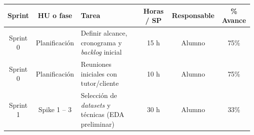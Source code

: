 \documentclass[
11pt, %
]{charter}
\begin{document}


\begin{table}[htpb]
\centering
\begin{tabularx}{\linewidth}{@{}|c|c|X|c|c|c|@{}}
\hline
\rowcolor[HTML]{C0C0C0}
Sprint & HU o fase & Tarea & Horas / SP & Responsable & \% Avance \\ \hline
Sprint 0 & Planificación & Definir alcance, cronograma y \textit{backlog} inicial & 15 h & Alumno & 75\% \\ \hline
Sprint 0 & Planificación & Reuniones iniciales con tutor/cliente & 10 h & Alumno & 75\% \\ \hline
Sprint 1 & Spike 1 – 3 & Selección de \textit{datasets} y técnicas (EDA preliminar) & 30 h & Alumno & 33\% \\ \hline

\end{tabularx}
\end{table}
\end{document}
